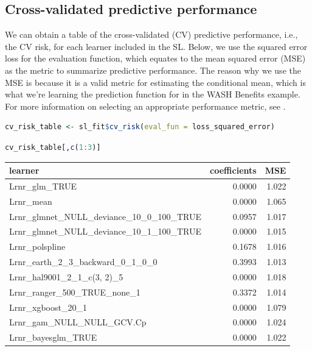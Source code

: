 \documentclass[
  12pt, krantz2,
]{krantz}
\newcommand{\1}{\mathbbm{1}}
\theoremstyle{definition}
\theoremstyle{definition}
\theoremstyle{definition}
\theoremstyle{definition}
\theoremstyle{remark}
\begin{document}
\hypertarget{cross-validated-predictive-performance}{%
\subsection{Cross-validated predictive performance}\label{cross-validated-predictive-performance}}

We can obtain a table of the cross-validated (CV) predictive performance, i.e.,
the CV risk, for each learner included in the SL. Below, we use the
squared error loss for the evaluation function, which equates to the mean
squared error (MSE) as the metric to summarize predictive performance. The
reason why we use the MSE is because it is a valid metric for estimating the
conditional mean, which is what we're learning the prediction function for in
the WASH Benefits example. For more information on selecting an appropriate
performance metric, see \citet{rvp2022super}.

\begin{lstlisting}[language=R]
cv_risk_table <- sl_fit$cv_risk(eval_fun = loss_squared_error)
\end{lstlisting}

\begin{lstlisting}[language=R]
cv_risk_table[,c(1:3)]
\end{lstlisting}

\begin{tabular}{l|r|r}
\hline
learner & coefficients & MSE\\
\hline
Lrnr\_glm\_TRUE & 0.0000 & 1.022\\
\hline
Lrnr\_mean & 0.0000 & 1.065\\
\hline
Lrnr\_glmnet\_NULL\_deviance\_10\_0\_100\_TRUE & 0.0957 & 1.017\\
\hline
Lrnr\_glmnet\_NULL\_deviance\_10\_1\_100\_TRUE & 0.0000 & 1.015\\
\hline
Lrnr\_polspline & 0.1678 & 1.016\\
\hline
Lrnr\_earth\_2\_3\_backward\_0\_1\_0\_0 & 0.3993 & 1.013\\
\hline
Lrnr\_hal9001\_2\_1\_c(3, 2)\_5 & 0.0000 & 1.018\\
\hline
Lrnr\_ranger\_500\_TRUE\_none\_1 & 0.3372 & 1.014\\
\hline
Lrnr\_xgboost\_20\_1 & 0.0000 & 1.079\\
\hline
Lrnr\_gam\_NULL\_NULL\_GCV.Cp & 0.0000 & 1.024\\
\hline
Lrnr\_bayesglm\_TRUE & 0.0000 & 1.022\\
\hline
\end{tabular}
\end{document}

